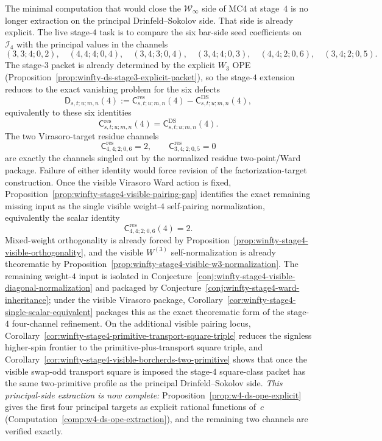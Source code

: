 \begin{remark}
\begin{remark}\label{rem:mc4-winfty-computation-target}
The minimal computation that would close the $\mathcal{W}_\infty$ side
of MC4 at stage~$4$ is no longer extraction on the principal
Drinfeld--Sokolov side.  That side is already explicit.  The live
stage-$4$ task is to compare the six bar-side seed coefficients on
$\mathcal{I}_4$ with the principal values in the channels
\[
(3,3;4;0,2),\quad
(4,4;4;0,4),\quad
(3,4;3;0,4),\quad
(3,4;4;0,3),\quad
(4,4;2;0,6),\quad
(3,4;2;0,5).
\]
The stage-$3$ packet is already determined by the explicit $W_3$ OPE
(Proposition~\ref{prop:winfty-ds-stage3-explicit-packet}), so the
stage-$4$ extension reduces to the exact vanishing problem for the six
defects
\[
\mathsf{D}_{s,t;u;m,n}(4)
:=
\mathsf{C}^{\mathrm{res}}_{s,t;u;m,n}(4)
-
\mathsf{C}^{\mathrm{DS}}_{s,t;u;m,n}(4),
\]
equivalently to these six identities
\[
\mathsf{C}^{\mathrm{res}}_{s,t;u;m,n}(4)
=
\mathsf{C}^{\mathrm{DS}}_{s,t;u;m,n}(4).
\]
The two Virasoro-target residue channels
\[
\mathsf{C}^{\mathrm{res}}_{4,4;2;0,6}=2,
\qquad
\mathsf{C}^{\mathrm{res}}_{3,4;2;0,5}=0
\]
are exactly the channels singled out by the normalized residue
two-point/Ward package.  Failure of either identity would force
revision of the factorization-target construction.  Once the visible
Virasoro Ward action is fixed,
Proposition~\ref{prop:winfty-stage4-visible-pairing-gap} identifies the
exact remaining missing input as the single visible weight-$4$
self-pairing normalization, equivalently the scalar identity
\[
\mathsf{C}^{\mathrm{res}}_{4,4;2;0,6}(4)=2.
\]
Mixed-weight orthogonality is already forced by
Proposition~\ref{prop:winfty-stage4-visible-orthogonality}, and the
visible $W^{(3)}$ self-normalization is already theorematic by
Proposition~\ref{prop:winfty-stage4-visible-w3-normalization}.  The
remaining weight-$4$ input is isolated in
Conjecture~\ref{conj:winfty-stage4-visible-diagonal-normalization} and
packaged by
Conjecture~\ref{conj:winfty-stage4-ward-inheritance}; under the visible
Virasoro package,
Corollary~\ref{cor:winfty-stage4-single-scalar-equivalent} packages
this as the exact theorematic form of the stage-$4$ four-channel
refinement.  On the additional visible pairing locus,
Corollary~\ref{cor:winfty-stage4-primitive-transport-square-triple}
reduces the signless higher-spin frontier to the
primitive-plus-transport square triple, and
Corollary~\ref{cor:winfty-stage4-visible-borcherds-two-primitive}
shows that once the visible swap-odd transport square is imposed the
stage-$4$ square-class packet has the same two-primitive profile as
the principal Drinfeld--Sokolov side.
\emph{This principal-side extraction is now complete:}
Proposition~\ref{prop:w4-ds-ope-explicit} gives the first four
principal targets as explicit rational functions of~$c$
\textup{(}Computation~\ref{comp:w4-ds-ope-extraction}\textup{)}, and the remaining two channels are verified
exactly.


\end{remark}
\end{remark}
